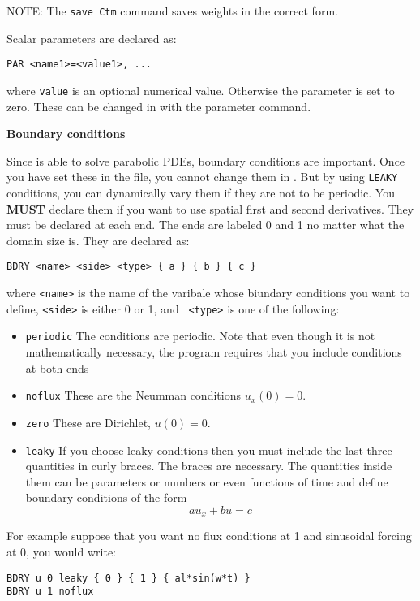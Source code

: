 NOTE:  The {\tt save Ctm} command saves weights in the correct form.

Scalar parameters are declared as:
\begin{verbatim}
PAR <name1>=<value1>, ...
\end{verbatim}
where {\tt value} is an optional numerical value.  Otherwise the
parameter is set to zero.  These can be changed in \xtc  with the
parameter command.

\vspace{.25in}
\begin{center}
{\bf \large Boundary conditions}
\end{center}
Since \xtc is able to solve parabolic PDEs, boundary conditions are
important.  Once you have set these in the file, you cannot change
them in \xtc.  But by using {\tt LEAKY} conditions, you can
dynamically vary them if they are not to be periodic.  You {\bf MUST}
declare them if you want to use spatial first and second derivatives.
They must be declared at each end.  The ends are labeled 0 and 1 no
matter what the domain size is. They are declared as:
\begin{verbatim}
BDRY <name> <side> <type> { a } { b } { c }
\end{verbatim}
where {\tt <name>} is the name of the varibale whose biundary
conditions you want to define, {\tt <side>} is either 0 or 1, and {\tt
<type>} is one of the following:
\begin{itemize}
\item {\tt periodic}  The conditions are periodic.  Note that even
though it is not mathematically necessary, the program requires that
you include conditions at both ends
\item {\tt noflux} These are the Neumman conditions $u_x(0)=0.$
\item {\tt zero} These are Dirichlet, $u(0)=0.$
\item {\tt leaky} If you choose leaky conditions then you must include
the last three quantities in curly braces.  The braces are necessary.
The quantities inside them can be parameters or numbers or even
functions of time and define boundary conditions of the form
\[
 au_x +bu = c
\]
\end{itemize}
For example suppose that you want no flux conditions at 1 and
sinusoidal forcing at 0, you would write:
\begin{verbatim}
BDRY u 0 leaky { 0 } { 1 } { al*sin(w*t) }
BDRY u 1 noflux
\end{verbatim}

